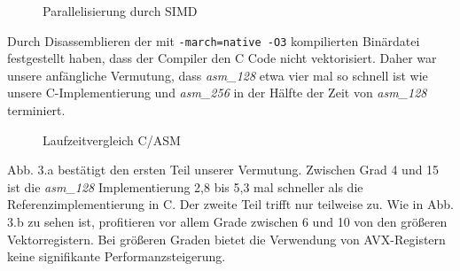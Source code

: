 \documentclass[course=erap]{aspdoc}
\begin{document}
\begin{figure}[htbp] 
    \centering
    \caption{Parallelisierung durch SIMD}%
    \label{fig:SIMD}%
\end{figure}

Durch Disassemblieren der mit \texttt{-march=native -O3} kompilierten Binärdatei festgestellt haben, dass der Compiler den C Code nicht vektorisiert. Daher war unsere anfängliche Vermutung, dass \textit{asm\_128} etwa vier mal so schnell ist wie unsere C-Implementierung und \textit{asm\_256} in der Hälfte der Zeit von \textit{asm\_128} terminiert.

\begin{figure}[htbp] 
    \centering
    \qquad
    \caption{Laufzeitvergleich C/ASM}%
    \label{fig:Laufzeitvergleich}%
 \end{figure}
 
 Abb. 3.a bestätigt den ersten Teil unserer Vermutung. Zwischen Grad 4 und 15 ist die \textit{asm\_128} Implementierung 2,8 bis 5,3 mal schneller als die Referenzimplementierung in C. Der zweite Teil trifft nur teilweise zu. Wie in Abb. 3.b zu sehen ist, profitieren vor allem Grade zwischen 6 und 10 von den größeren Vektorregistern. Bei größeren Graden bietet die Verwendung von AVX-Registern keine signifikante Performanzsteigerung.
 
\end{document}

